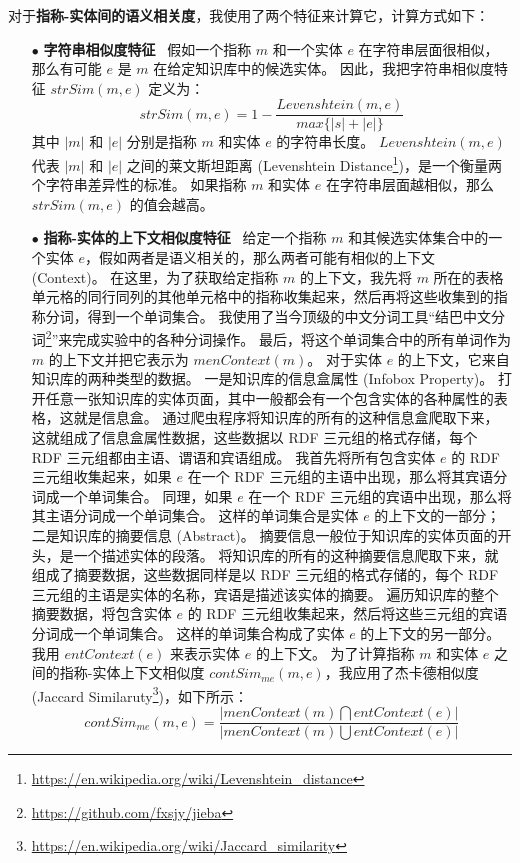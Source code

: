 对于\textbf{指称-实体间的语义相关度}，我使用了两个特征来计算它，计算方式如下：
\begin{itemize}
	\item[$\bullet$] \textbf{字符串相似度特征} \ 
	假如一个指称 $m$ 和一个实体 $e$ 在字符串层面很相似，那么有可能 $e$ 是 $m$ 在给定知识库中的候选实体。
	因此，我把字符串相似度特征 $strSim(m,e)$ 定义为：
	\begin{equation}
	strSim(m,e)=1-\frac{Levenshtein(m,e)}{max\{|s|+|e|\}}
	\label{strsim}
	\end{equation}
	其中 $|m|$ 和 $|e|$ 分别是指称 $m$ 和实体 $e$ 的字符串长度。
	$Levenshtein(m,e)$ 代表 $|m|$ 和 $|e|$ 之间的莱文斯坦距离 (Levenshtein Distance\footnote{\url{https://en.wikipedia.org/wiki/Levenshtein_distance}})，是一个衡量两个字符串差异性的标准。
	如果指称 $m$ 和实体 $e$ 在字符串层面越相似，那么 $strSim(m,e)$ 的值会越高。
	\item[$\bullet$] \textbf{指称-实体的上下文相似度特征} \ 
	给定一个指称 $m$ 和其候选实体集合中的一个实体 $e$，假如两者是语义相关的，那么两者可能有相似的上下文 (Context)。
	在这里，为了获取给定指称 $m$ 的上下文，我先将 $m$ 所在的表格单元格的同行同列的其他单元格中的指称收集起来，然后再将这些收集到的指称分词，得到一个单词集合。
	我使用了当今顶级的中文分词工具``结巴中文分词\footnote{\url{https://github.com/fxsjy/jieba}}''来完成实验中的各种分词操作。
	最后，将这个单词集合中的所有单词作为 $m$ 的上下文并把它表示为 $menContext(m)$。
	对于实体 $e$ 的上下文，它来自知识库的两种类型的数据。
	一是知识库的信息盒属性 (Infobox Property)。
	打开任意一张知识库的实体页面，其中一般都会有一个包含实体的各种属性的表格，这就是信息盒。
	通过爬虫程序将知识库的所有的这种信息盒爬取下来，这就组成了信息盒属性数据，这些数据以 RDF\cite{munoz2014using} 三元组的格式存储，每个 RDF 三元组都由主语、谓语和宾语组成。
	我首先将所有包含实体 $e$ 的 RDF 三元组收集起来，如果 $e$ 在一个 RDF 三元组的主语中出现，那么将其宾语分词成一个单词集合。
	同理，如果 $e$ 在一个 RDF 三元组的宾语中出现，那么将其主语分词成一个单词集合。
	这样的单词集合是实体 $e$ 的上下文的一部分；
	二是知识库的摘要信息 (Abstract)。
	摘要信息一般位于知识库的实体页面的开头，是一个描述实体的段落。
	将知识库的所有的这种摘要信息爬取下来，就组成了摘要数据，这些数据同样是以 RDF 三元组的格式存储的，每个 RDF 三元组的主语是实体的名称，宾语是描述该实体的摘要。
	遍历知识库的整个摘要数据，将包含实体 $e$ 的 RDF 三元组收集起来，然后将这些三元组的宾语分词成一个单词集合。
	这样的单词集合构成了实体 $e$ 的上下文的另一部分。
	我用 $entContext(e)$ 来表示实体 $e$ 的上下文。
	为了计算指称 $m$ 和实体 $e$ 之间的指称-实体上下文相似度 $contSim_{me}(m,e)$，我应用了杰卡德相似度 (Jaccard Similaruty\footnote{\url{https://en.wikipedia.org/wiki/Jaccard_similarity}})，如下所示：
	\begin{equation}
	contSim_{me}(m,e)=\frac{|menContext(m)\bigcap{entContext(e)}|}{|menContext(m)\bigcup{entContext(e)}|}
	\end{equation}
\end{itemize}

